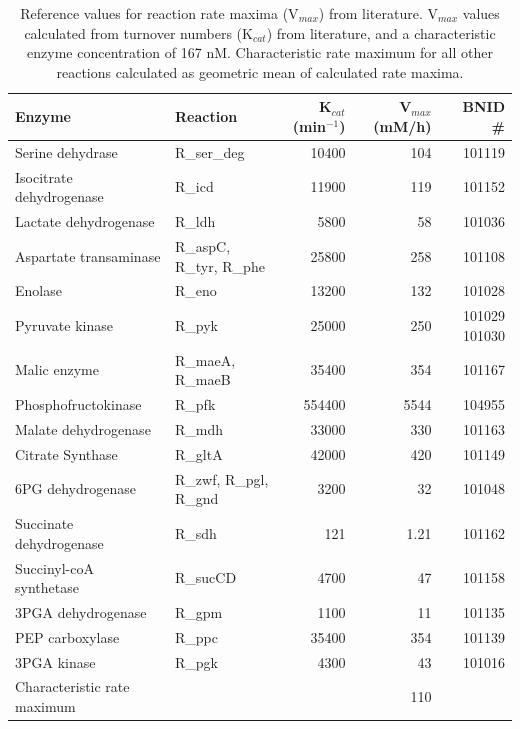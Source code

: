 \documentclass[12pt]{article}
\begin{document}
\begin{table}
\centering
 \caption{Reference values for reaction rate maxima (V$_{max}$) from literature. V$_{max}$ values calculated from turnover numbers (K$_{cat}$) from literature, and a characteristic enzyme concentration of 167 nM. Characteristic rate maximum for all other reactions calculated as geometric mean of calculated rate maxima.}
 \renewcommand{\arraystretch}{1.3}
 \begin{tabular}{llrrr} \toprule
\phantom{i}\textbf{Enzyme} & \textbf{Reaction} & \textbf{K$_{cat}$ (min$^{-1}$)} & 
 \textbf{V$_{max}$ (mM/h)} & \textbf{BNID \#} \\ \hline
\phantom{i}Serine dehydrase & R\_ser\_deg & 10400 & 104 & 101119 \\ \hline
\phantom{i}Isocitrate dehydrogenase & R\_icd & 11900 & 119 & 101152 \\ \hline
\phantom{i}Lactate dehydrogenase & R\_ldh & 5800 & 58 & 101036 \\ \hline
\smallskip
\rule{0pt}{4.5ex}
Aspartate transaminase & \parbox{1 cm}{R\_aspC, R\_tyr, R\_phe} & 25800 & 258 & 101108 \\ \hline
\phantom{i}Enolase & R\_eno & 13200 & 132 & 101028 \\ \hline
\smallskip
\rule{0pt}{3ex}
Pyruvate kinase & R\_pyk & 25000 & 250 & \parbox{1.4 cm}{101029 101030} \\ \hline
\smallskip
\rule{0pt}{3ex}
Malic enzyme & \parbox{1 cm}{R\_maeA, R\_maeB} & 35400 & 354 & 101167 \\ \hline
\phantom{i}Phosphofructokinase & R\_pfk & 554400 & 5544 & 104955 \\ \hline
\phantom{i}Malate dehydrogenase & R\_mdh & 33000 & 330 & 101163 \\ \hline
\phantom{i}Citrate Synthase & R\_gltA & 42000 & 420 & 101149 \\ \hline
\smallskip
\rule{0pt}{4.5ex}
6PG dehydrogenase & \parbox{1 cm}{R\_zwf, R\_pgl, R\_gnd} &3200 & 32 & 101048 \\ \hline
\phantom{i}Succinate dehydrogenase & R\_sdh & 121 & 1.21 & 101162 \\ \hline
\phantom{i}Succinyl-coA synthetase & R\_sucCD & 4700 & 47 & 101158 \\ \hline
\phantom{i}3PGA dehydrogenase & R\_gpm & 1100 & 11 & 101135 \\ \hline
\phantom{i}PEP carboxylase & R\_ppc & 35400 & 354 & 101139 \\ \hline
\phantom{i}3PGA kinase & R\_pgk & 4300 & 43 & 101016 \\ \hline
\phantom{i}Characteristic rate maximum & & & 110 & \\ \bottomrule
 \end{tabular}
\label{tbl:Rate_maxima}
\end{table}
\end{document}
